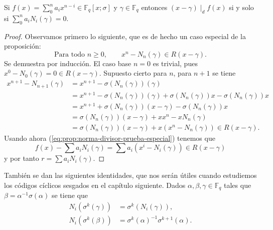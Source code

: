 \begin{proposition}
  \label{prop:norma-divisor}
  Si \(f(x) = \sum_0^n a_ix^{n-i} \in \mathbb F_q[x; \sigma]\) y \(\gamma \in \mathbb F_q\) entonces \((x - \gamma) \mid_d f(x)\) si y solo si \(\sum_0^n a_iN_{i}(\gamma) = 0\).
\end{proposition}

\begin{proof}
  Observamos primero lo siguiente, que es de hecho un caso especial de la proposición:
  \begin{equation}
    \label{eq:prop:norma-divisor-prueba-especial}
    \text{Para todo } n \geq 0, \qquad x^n - N_n(\gamma) \in R(x - \gamma).
  \end{equation}
  Se demuestra por inducción.
  El caso base \(n = 0\) es trivial, pues \(x ^0 - N_0(\gamma) = 0 \in R(x - \gamma)\).
  Supuesto cierto para \(n\), para \(n + 1\) se tiene
  \begin{align*}
    x^{n+1} - N_{n+1}(\gamma) &= x^{n+1} - \sigma(N_{n}(\gamma))(\gamma)\\
      &= x^{n+1} - \sigma(N_{n}(\gamma))(\gamma) + \sigma(N_n(\gamma))x - \sigma(N_n(\gamma))x\\
      &= x^{n+1} + \sigma(N_{n}(\gamma))(x - \gamma) - \sigma(N_n(\gamma))x\\
      &= \sigma(N_{n}(\gamma))(x - \gamma) + xx^{n} - xN_n(\gamma)\\
      &= \sigma(N_{n}(\gamma))(x - \gamma) + x(x^{n} - N_n(\gamma))\in R(x - \gamma).
  \end{align*}
  Usando ahora (\ref{eq:prop:norma-divisor-prueba-especial}) tenemos que 
  \[
    f(x) - \sum a_iN_i(\gamma) = \sum a_i(x^{i} - N_i(\gamma)) \in R(x - \gamma)
  \]
  y por tanto \(r = \sum a_iN_i(\gamma)\).
\end{proof}

También se dan las siguientes identidades, que nos serán útiles cuando estudiemos los códigos cíclicos sesgados en el capítulo siguiente.
Dados \(\alpha, \beta, \gamma \in \mathbb F_q\) tales que \(\beta = \alpha^{-1}\sigma(\alpha)\) se tiene que
\begin{align}
  N_i(\sigma^k(\gamma)) &= \sigma^k(N_i(\gamma)),\nonumber\\
  N_i(\sigma^k(\beta)) &= \sigma^k(\alpha)^{-1}\sigma^{k+1}(\alpha).
  \label{eq:norma-beta}
\end{align}